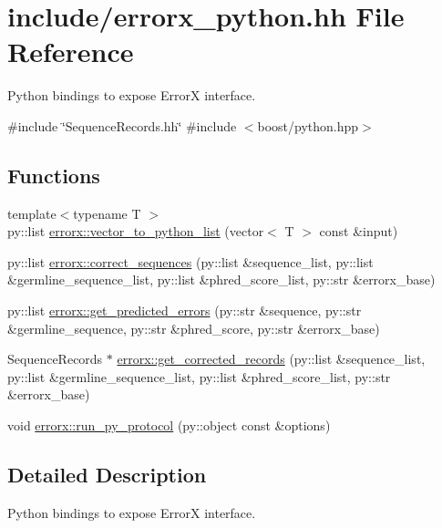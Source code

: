 \hypertarget{errorx__python_8hh}{}\section{include/errorx\+\_\+python.hh File Reference}
\label{errorx__python_8hh}


Python bindings to expose ErrorX interface.  


{\ttfamily \#include \char`\"{}Sequence\+Records.\+hh\char`\"{}}\newline
{\ttfamily \#include $<$boost/python.\+hpp$>$}\newline
\subsection*{Functions}
\begin{DoxyCompactItemize}
\item 
{\footnotesize template$<$typename T $>$ }\\py\+::list \mbox{\hyperlink{errorx__python_8hh_a78a6da555a72f6000521dc688b9b96fd}{errorx\+::vector\+\_\+to\+\_\+python\+\_\+list}} (vector$<$ T $>$ const \&input)
\item 
py\+::list \mbox{\hyperlink{errorx__python_8hh_a050d2340bb4af56f471eb0a04ebe88d1}{errorx\+::correct\+\_\+sequences}} (py\+::list \&sequence\+\_\+list, py\+::list \&germline\+\_\+sequence\+\_\+list, py\+::list \&phred\+\_\+score\+\_\+list, py\+::str \&errorx\+\_\+base)
\item 
py\+::list \mbox{\hyperlink{errorx__python_8hh_a1a4401d55871f8aca812f65abcff46b3}{errorx\+::get\+\_\+predicted\+\_\+errors}} (py\+::str \&sequence, py\+::str \&germline\+\_\+sequence, py\+::str \&phred\+\_\+score, py\+::str \&errorx\+\_\+base)
\item 
Sequence\+Records $\ast$ \mbox{\hyperlink{errorx__python_8hh_a29ed43601a05bb43dc7ad64849db054c}{errorx\+::get\+\_\+corrected\+\_\+records}} (py\+::list \&sequence\+\_\+list, py\+::list \&germline\+\_\+sequence\+\_\+list, py\+::list \&phred\+\_\+score\+\_\+list, py\+::str \&errorx\+\_\+base)
\item 
void \mbox{\hyperlink{errorx__python_8hh_ac6fa2bc931a560730bd2983e34e0de43}{errorx\+::run\+\_\+py\+\_\+protocol}} (py\+::object const \&options)
\end{DoxyCompactItemize}


\subsection{Detailed Description}
Python bindings to expose ErrorX interface. 

